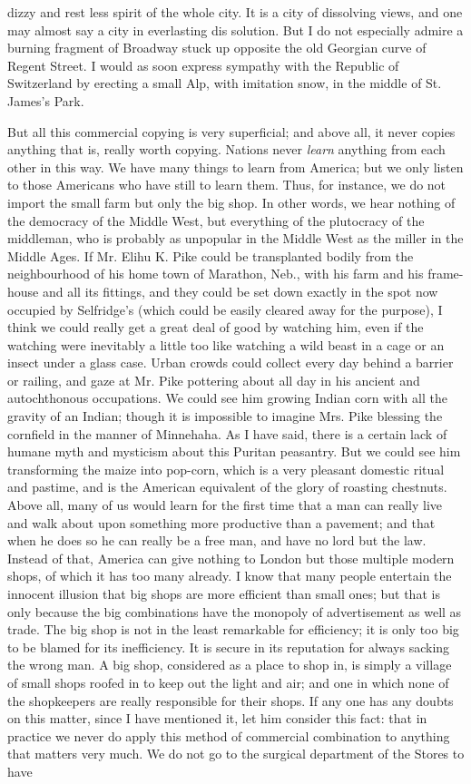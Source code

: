 \documentclass{book}
\begin{document}
dizzy and rest less spirit of the whole city. It is a city of dissolving views, and one may almost say a city in everlasting dis solution. But I do not especially admire a burning fragment of Broadway stuck up opposite the old Georgian curve of Regent Street. I would as soon express sympathy with the Republic of Switzerland by erecting a small Alp, with imitation snow, in the middle of St. James’s Park.

But all this commercial copying is very superficial; and above all, it never copies anything that is, really worth copying. Nations never \emph{learn} anything from each other in this way. We have many things to learn from America; but we only listen to those Americans who have still to learn them. Thus, for instance, we do not import the small farm but only the big shop. In other words, we hear nothing of the democracy of the Middle West, but everything of the plutocracy of the middleman, who is probably as unpopular in the Middle West as the miller in the Middle Ages. If Mr. Elihu K. Pike could be transplanted bodily from the neighbourhood of his home town of Marathon, Neb., with his farm and his frame-house and all its fittings, and they could be set down exactly in the spot now occupied by Selfridge’s (which could be easily cleared away for the purpose), I think we could really get a great deal of good by watching him, even if the watching were inevitably a little too like watching a wild beast in a cage or an insect under a glass case. Urban crowds could collect every day behind a barrier or railing, and gaze at Mr. Pike pottering about all day in his ancient and autochthonous occupations. We could see him growing Indian corn with all the gravity of an Indian; though it is impossible to imagine Mrs. Pike blessing the cornfield in the manner of Minnehaha. As I have said, there is a certain lack of humane myth and mysticism about this Puritan peasantry. But we could see him transforming the maize into pop-corn, which is a very pleasant domestic ritual and pastime, and is the American equivalent of the glory of roasting chestnuts. Above all, many of us would learn for the first time that a man can really live and walk about upon something more productive than a pavement; and that when he does so he can really be a free man, and have no lord but the law. Instead of that, America can give nothing to London but those multiple modern shops, of which it has too many already. I know that many people entertain the innocent illusion that big shops are more efficient than small ones; but that is only because the big combinations have the monopoly of advertisement as well as trade. The big shop is not in the least remarkable for efficiency; it is only too big to be blamed for its inefficiency. It is secure in its reputation for always sacking the wrong man. A big shop, considered as a place to shop in, is simply a village of small shops roofed in to keep out the light and air; and one in which none of the shopkeepers are really responsible for their shops. If any one has any doubts on this matter, since I have mentioned it, let him consider this fact: that in practice we never do apply this method of commercial combination to anything that matters very much. We do not go to the surgical department of the Stores to have 
\end{document}
